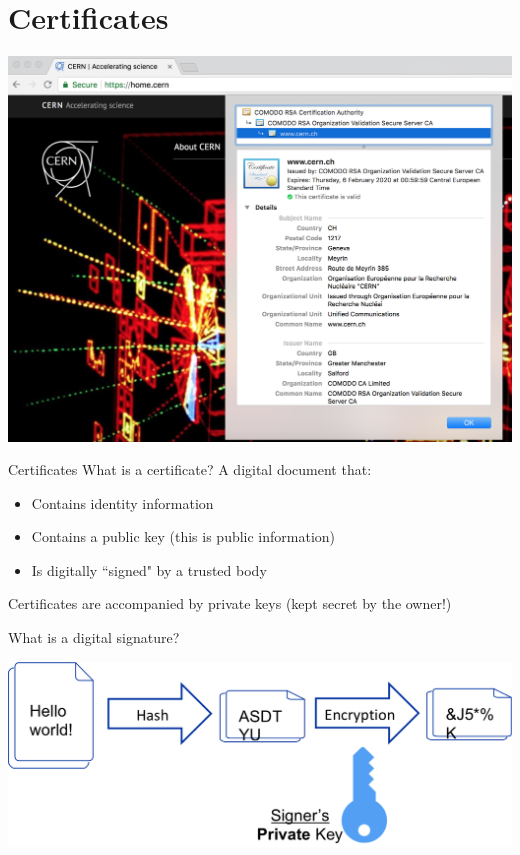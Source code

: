 \documentclass{beamer}
\begin{document}
\section{Certificates}
\frame{\sectionpage}

\begin{frame}
\begin{center}
\includegraphics[width=0.9\linewidth]{cern-certificate.png}
\end{center}
\end{frame}

\begin{frame}{Certificates}
What is a certificate? A digital document that:
\begin{itemize}
\item Contains identity information
\item Contains a public key (this is public information)
\item Is digitally ``signed" by a trusted body 
\end{itemize}
Certificates are accompanied by private keys (kept secret by the owner!)
\end{frame}

\begin{frame}{{\color{red}What is a digital signature?}}
\begin{center}
\includegraphics[width=0.9\linewidth]{digital-signature.png}
\end{center}
\end{frame}
\end{document}
